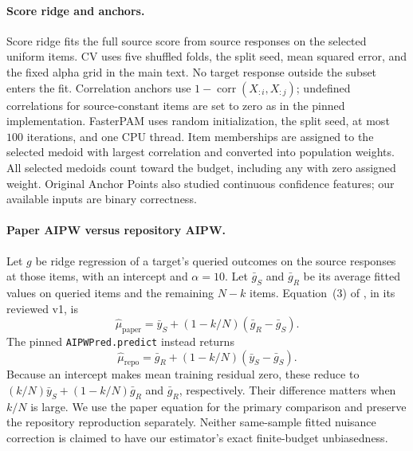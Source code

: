 \documentclass{article}
\begin{document}
\paragraph{Score ridge and anchors.}
Score ridge fits the full source score from source responses on the selected uniform items. CV uses five shuffled folds, the split seed, mean squared error, and the fixed alpha grid in the main text. No target response outside the subset enters the fit. Correlation anchors use $1-\operatorname{corr}(X_{:i},X_{:j})$; undefined correlations for source-constant items are set to zero as in the pinned implementation. FasterPAM uses random initialization, the split seed, at most $100$ iterations, and one CPU thread. Item memberships are assigned to the selected medoid with largest correlation and converted into population weights. All selected medoids count toward the budget, including any with zero assigned weight. Original Anchor Points also studied continuous confidence features; our available inputs are binary correctness.

\paragraph{Paper AIPW versus repository AIPW.}
Let $g$ be ridge regression of a target's queried outcomes on the source responses at those items, with an intercept and $\alpha=10$. Let $\bar g_S$ and $\bar g_R$ be its average fitted values on queried items and the remaining $N-k$ items. Equation~(3) of \citet{zhang2025}, in its reviewed v1, is
\begin{equation}
\widehat\mu_{\mathrm{paper}}=\bar y_S+(1-k/N)(\bar g_R-\bar g_S).
\label{eq:aipw-paper}
\end{equation}
The pinned \texttt{AIPWPred.predict} instead returns
\begin{equation}
\widehat\mu_{\mathrm{repo}}=\bar g_R+(1-k/N)(\bar y_S-\bar g_S).
\label{eq:aipw-repo}
\end{equation}
Because an intercept makes mean training residual zero, these reduce to $(k/N)\bar y_S+(1-k/N)\bar g_R$ and $\bar g_R$, respectively. Their difference matters when $k/N$ is large. We use the paper equation for the primary comparison and preserve the repository reproduction separately. Neither same-sample fitted nuisance correction is claimed to have our estimator's exact finite-budget unbiasedness.
\end{document}
